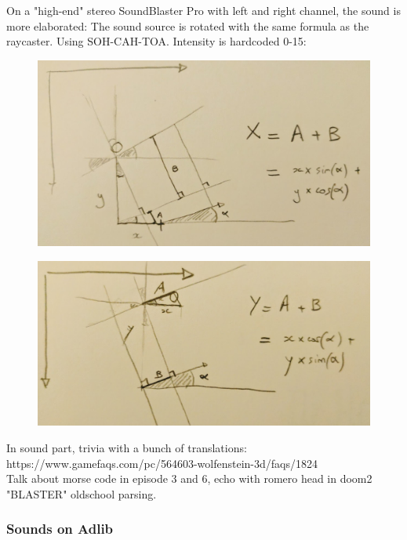 On a "high-end" stereo SoundBlaster Pro with left and right channel, the sound is more elaborated: The sound source is rotated with the same formula as the raycaster. Using SOH-CAH-TOA. Intensity is hardcoded 0-15:\\
\par
\begin{figure}[H]
\centering
 \includegraphics[width=\textwidth]{imgs/drawings/audio_y_rotate.png}
 \end{figure}
 \par
 \begin{figure}[H]
\centering
 \includegraphics[width=\textwidth]{imgs/drawings/audio_x_rotate.png}
 \end{figure}
\par
In sound part, trivia with a bunch of translations: https://www.gamefaqs.com/pc/564603-wolfenstein-3d/faqs/1824\\
Talk about morse code in episode 3 and 6, echo with romero head in doom2\\
"BLASTER" oldschool parsing.



\subsubsection{Sounds on Adlib}
